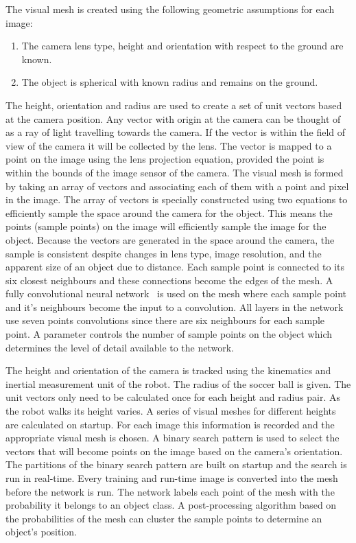 \documentclass{llncs}
\begin{document}
The visual mesh is created using the following geometric assumptions for each image:
\begin{enumerate}
    \item The camera lens type, height and orientation with respect to the ground are known. 
    \item The object is spherical with known radius and remains on the ground.
\end{enumerate}
The height, orientation and radius are used to create a set of unit vectors based at the camera position. Any vector with origin at the camera can be thought of as a ray of light travelling towards the camera. If the vector is within the field of view of the camera it will be collected by the lens. The vector is mapped to a point on the image using the lens projection equation, provided the point is within the bounds of the image sensor of the camera. The visual mesh is formed by taking an array of vectors and associating each of them with a point and pixel in the image. The array of vectors is specially constructed using two equations to efficiently sample the space around the camera for the object. This means the points (sample points) on the image will efficiently sample the image for the object. Because the vectors are generated in the space around the camera, the sample is consistent despite changes in lens type, image resolution, and the apparent size of an object due to distance. Each sample point is connected to its six closest neighbours and these connections become the edges of the mesh. A fully convolutional neural network~\cite{ShelmarLong2017} is used on the mesh where each sample point and it's neighbours become the input to a convolution. All layers in the network use seven points convolutions since there are six neighbours for each sample point. A parameter controls the number of sample points on the object which determines the level of detail available to the network. 

The height and orientation of the camera is tracked using the kinematics and inertial measurement unit of the robot. The radius of the soccer ball is given. The unit vectors only need to be calculated once for each height and radius pair. As the robot walks its height varies. A series of visual meshes for different heights are calculated on startup. For each image this information is recorded and the appropriate visual mesh is chosen. A binary search pattern is used to select the vectors that will become points on the image based on the camera's orientation. The partitions of the binary search pattern are built on startup and the search is run in real-time. Every training and run-time image is converted into the mesh before the network is run. The network labels each point of the mesh with the probability it belongs to an object class. A post-processing algorithm based on the probabilities of the mesh can cluster the sample points to determine an object's position.
\end{document}
